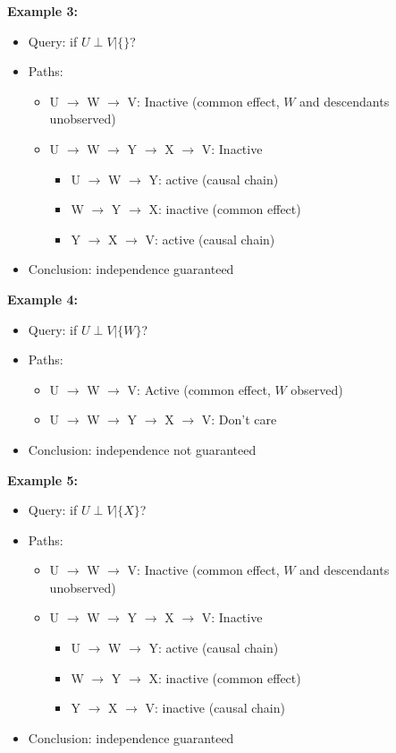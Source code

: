 \documentclass[10pt]{article}
\begin{document}
\textbf{Example 3:}
\begin{itemize}
	\item Query: if $U \perp V | \{\}$?
	\item Paths: 
	\begin{itemize}
	    \item U $\rightarrow$ W $\rightarrow$ V:  Inactive (common effect, $W$ and descendants unobserved)
	    \item U $\rightarrow$ W $\rightarrow$ Y $\rightarrow$ X $\rightarrow$ V:  Inactive
	    \begin{itemize}
	        \item U $\rightarrow$ W $\rightarrow$ Y: active (causal chain)
	        \item W $\rightarrow$ Y $\rightarrow$ X: inactive (common effect)
	        \item Y $\rightarrow$ X $\rightarrow$ V: active (causal chain)
        \end{itemize}
    \end{itemize}
    \item Conclusion: independence guaranteed
\end{itemize}
\textbf{Example 4:}
\begin{itemize}
	\item Query: if $U \perp V | \{W\}$?
	\item Paths: 
	\begin{itemize}
	    \item U $\rightarrow$ W $\rightarrow$ V:  Active (common effect, $W$ observed)
	    \item U $\rightarrow$ W $\rightarrow$ Y $\rightarrow$ X $\rightarrow$ V:  Don't care
    \end{itemize}
    \item Conclusion: independence not guaranteed
\end{itemize}
\textbf{Example 5:}
\begin{itemize}
	\item Query: if $U \perp V | \{X\}$?
	\item Paths: 
	\begin{itemize}
	    \item U $\rightarrow$ W $\rightarrow$ V:  Inactive (common effect, $W$ and descendants unobserved)
	    \item U $\rightarrow$ W $\rightarrow$ Y $\rightarrow$ X $\rightarrow$ V:  Inactive
	    \begin{itemize}
	        \item U $\rightarrow$ W $\rightarrow$ Y: active (causal chain)
	        \item W $\rightarrow$ Y $\rightarrow$ X: inactive (common effect)
	        \item Y $\rightarrow$ X $\rightarrow$ V: inactive (causal chain)
        \end{itemize}
    \end{itemize}
    \item Conclusion: independence guaranteed
\end{itemize}
\end{document}
